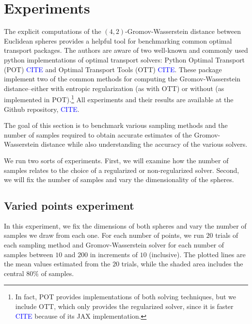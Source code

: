 \documentclass{article}
\begin{document}
\section{Experiments}
The explicit computations of the $(4, 2)$-Gromov-Wasserstein distance between
Euclidean spheres provides a helpful tool for benchmarking common optimal
transport packages. The authors are aware of two well-known and commonly used
python implementations of optimal transport solvers: Python Optimal Transport
(POT) \textcolor{blue}{CITE} and Optimal Transport Tools (OTT)
\textcolor{blue}{CITE}. These package implement two of the common methods for
computing the Gromov-Wasserstein distance--either with entropic regularization
(as with OTT) or without (as implemented in POT).\footnote{In fact, POT
provides implementations of both solving techniques, but we include OTT, which
only provides the regularized solver, since it is faster \textcolor{blue}{CITE}
because of its JAX implementation.} All experiments and their results are
available at the Github repository, \textcolor{blue}{CITE}.

The goal of this section is to benchmark various sampling methods and the
number of samples required to obtain accurate estimates of the
Gromov-Wasserstein distance while also understanding the accuracy of the
various solvers.

We run two sorts of experiments. First, we will examine how the number of
samples relates to the choice of a regularized or non-regularized solver.
Second, we will fix the number of samples and vary the dimensionality of the
spheres.

\subsection{Varied points experiment}

In this experiment, we fix the dimensions of both spheres and vary the number
of samples we draw from each one. For each number of points, we run $20$ trials
of each sampling method and Gromov-Wasserstein solver for each number of
samples between $10$ and $200$ in increments of $10$ (inclusive). The plotted
lines are the mean values estimated from the $20$ trials, while the shaded area
includes the central $80\%$ of samples.
\end{document}
